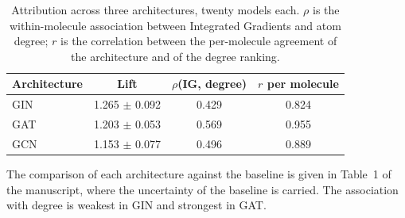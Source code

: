 \begin{table}[htbp]
\centering
\caption{Attribution across three architectures, twenty models each. $\rho$ is the within-molecule association between Integrated Gradients and atom degree; $r$ is the correlation between the per-molecule agreement of the architecture and of the degree ranking.}
\label{tab:architectures}
\small
\setlength{\tabcolsep}{4pt}
\begin{tabular}{lccc}
\toprule
Architecture & Lift & $\rho$(IG, degree) & $r$ per molecule \\
\midrule
GIN & 1.265 $\pm$ 0.092 & 0.429 & 0.824 \\
GAT & 1.203 $\pm$ 0.053 & 0.569 & 0.955 \\
GCN & 1.153 $\pm$ 0.077 & 0.496 & 0.889 \\
\bottomrule
\end{tabular}
\begin{flushleft}\footnotesize The comparison of each architecture against the baseline is given in Table~1 of the manuscript, where the uncertainty of the baseline is carried. The association with degree is weakest in GIN and strongest in GAT.\end{flushleft}
\end{table}
